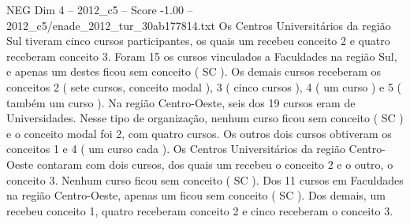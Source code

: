 \begin{textsample}{NEG Dim 4 – 2012\_c5 – Score -1.00 – 2012\_c5/enade\_2012\_tur\_30ab177814.txt}
Os Centros Universitários da região Sul tiveram cinco cursos participantes, os quais um recebeu conceito 2 e quatro receberam conceito 3.
Foram 15 os cursos vinculados a Faculdades na região Sul, e apenas um destes ficou sem conceito ( SC ).
Os demais cursos receberam os conceitos 2 ( sete cursos, conceito modal ), 3 ( cinco cursos ), 4 ( um curso ) e 5 ( também um curso ).
Na região Centro-Oeste, seis dos 19 cursos eram de Universidades.
Nesse tipo de organização, nenhum curso ficou sem conceito ( SC ) e o conceito modal foi 2, com quatro cursos.
Os outros dois cursos obtiveram os conceitos 1 e 4 ( um curso cada ).
Os Centros Universitários da região Centro-Oeste contaram com dois cursos, dos quais um recebeu o conceito 2 e o outro, o conceito 3.
Nenhum curso ficou sem conceito ( SC ).
Dos 11 cursos em Faculdades na região Centro-Oeste, apenas um ficou sem conceito ( SC ).
Dos demais, um recebeu conceito 1, quatro receberam conceito 2 e cinco receberam o conceito 3.

\end{textsample}
